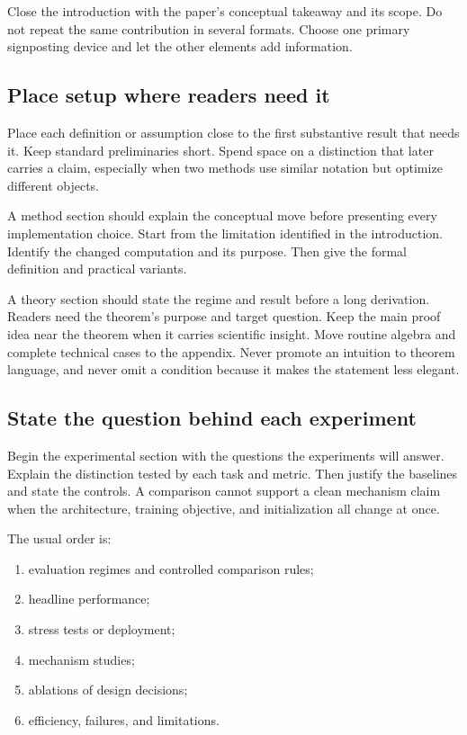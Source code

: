 Close the introduction with the paper's conceptual takeaway and its scope.
Do not repeat the same contribution in several formats. Choose one primary
signposting device and let the other elements add information.

\subsection{Place setup where readers need it}

Place each definition or assumption close to the first substantive result that
needs it. Keep standard preliminaries short. Spend space on a distinction that
later carries a claim, especially when two methods use similar notation but
optimize different objects.

A method section should explain the conceptual move before presenting every
implementation choice. Start from the limitation identified in the
introduction. Identify the changed computation and its purpose. Then give the
formal definition and practical variants.

A theory section should state the regime and result before a long derivation.
Readers need the theorem's purpose and target question. Keep the main proof
idea near the theorem when it carries scientific insight. Move routine algebra
and complete technical cases to the appendix. Never promote an intuition to
theorem language, and never omit a condition because it makes the statement
less elegant.

\subsection{State the question behind each experiment}

Begin the experimental section with the questions the experiments will answer.
Explain the distinction tested by each task and metric. Then justify the
baselines and state the controls. A comparison cannot support a clean mechanism
claim when the architecture, training objective, and initialization all change
at once.

The usual order is:

\begin{enumerate}[leftmargin=*]
    \item evaluation regimes and controlled comparison rules;
    \item headline performance;
    \item stress tests or deployment;
    \item mechanism studies;
    \item ablations of design decisions;
    \item efficiency, failures, and limitations.
\end{enumerate}

